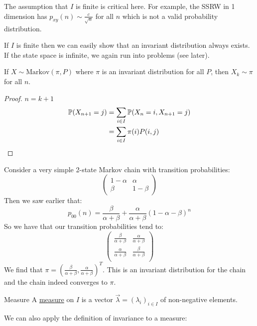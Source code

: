 \documentclass[../Main.tex]{subfiles}
\begin{document}
\begin{remarks}
    \item The assumption that $I$ is finite is critical here. For example, the SSRW in 1 dimension has $p_{xy}(n) \sim \frac{c}{\sqrt{n}}$ for all $n$ which is not a valid probability distribution.
    \item If $I$ is finite then we can easily show that an invariant distribution always exists. If the state space is infinite, we again run into problems (see later).
\end{remarks}
\begin{proposition}
    If $X \sim \text{Markov}(\pi, P)$ where $\pi$ is an invariant distribution for all $P$, then $X_k \sim \pi$ for all $n$.
    \label{propStayAtInvDist}
\end{proposition}
\begin{proof}
    {$n = k + 1$}{
        \begin{align*}
            \P(X_{n+1} = j) &= \sum_{i \in I} \P(X_n = i, X_{n+1} = j) \\
            &= \sum_{i \in I} \pi(i) P(i, j)
        \end{align*}
    }
\end{proof}
\begin{example}
    Consider a very simple 2-state Markov chain with transition probabilities:
    \begin{equation*}
        \begin{pmatrix}
            1-\alpha & \alpha \\
            \beta & 1-\beta
        \end{pmatrix}
    \end{equation*}
    Then we saw earlier that:
    \begin{equation*}
        p_{00}(n) = \frac{\beta}{\alpha + \beta} + \frac{\alpha}{\alpha + \beta}(1 - \alpha - \beta)^n
    \end{equation*}
    So we have that our transition probabilities tend to:
    \begin{equation*}
        \begin{pmatrix}
            \frac{\beta}{\alpha + \beta} & \frac{\alpha}{\alpha + \beta} \\
            \frac{\alpha}{\alpha + \beta} & \frac{\beta}{\alpha + \beta} \\
        \end{pmatrix}
    \end{equation*}
    We find that $\pi = \left(\frac{\beta}{\alpha + \beta}, \frac{\alpha}{\alpha + \beta}\right)^T$. This is an invariant distribution for the chain and the chain indeed converges to $\pi$.
\end{example}
\begin{definition}{Measure}
    A \underline{measure} on $I$ is a vector $\vec{\lambda} = (\lambda_i)_{i \in I}$ of non-negative elements.
\end{definition}
We can also apply the definition of invariance to a measure:
\end{document}
